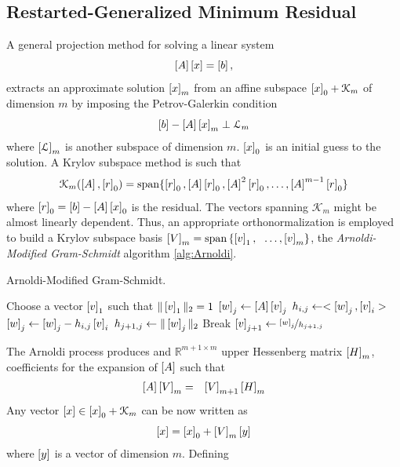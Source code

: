 \subsection{Restarted-Generalized Minimum Residual}

A general projection method for solving a linear system 
$$ \left[A\right] \left[{{x}}\right] = \left[{{b}}\right], $$ 
\noindent extracts an approximate solution $\left[{{x}}\right]_m$ from an affine subspace $\left[{{x}}\right]_0 + \mathcal{K}_m$ of dimension $m$ by imposing the Petrov-Galerkin condition
$$ \left[{{b}}\right] - \left[A\right]\left[{{x}}\right]_m \perp \mathcal{L}_m$$
\noindent where $\left[\mathcal{L}\right]_m$ is another subspace of dimension $m$. $\left[x\right]_0$ is an initial guess to the solution.
A Krylov subspace method is such that
$$\mathcal{K}_m(\left[A\right],\left[{{r}}\right]_0) = \mathrm{span}\{\left[{{r}}\right]_0, \left[A\right]\left[{{r}}\right]_0, \left[A\right]^2\left[{{r}}\right]_0,\ldots,\left[A\right]^{m-1}\left[{{r}}\right]_0\} $$
\noindent where $\left[{{r}}\right]_0 = \left[{{b}}\right]-\left[A\right]\left[{{x}}\right]_0$ is the residual. The vectors spanning $\mathcal{K}_m$ 
might be almost linearly dependent. Thus, an appropriate orthonormalization is employed to build a Krylov subspace basis $\left[V\right]_m = \mathrm{span}\left\{\left[{{v}}\right]_1,\right.$ $\left.\ldots,\left[{{v}}\right]_m 	\right\}$, the \textit{Arnoldi-Modified Gram-Schmidt} algorithm \ref{alg:Arnoldi}.
\begin{algorithm}[ht!]
\begin{algorithmic}
\caption{Arnoldi-Modified Gram-Schmidt.}
\label{alg:Arnoldi}
\State Choose a vector $\left[{{v}}\right]_1$ such that $\Vert \left[{{v}}\right]_1 \Vert_2 = 1$
    \State $\left[{{w}}\right]_j \gets \left[A\right] \left[{{v}}\right]_j$
    	\State $h_{i,j} \gets <\left[{{w}}\right]_j,\left[{{v}}\right]_i>$
		\State $\left[{{w}}\right]_j \gets \left[{{w}}\right]_j - h_{i,j} \left[{{v}}\right]_i$
    \EndFor
    \State $h_{j+1,j} \gets \Vert \left[{{w}}\right]_j \Vert_2$
     \State Break \EndIf
    \State $\left[{{v}}\right]_{j+1} \gets \nicefrac{\left[{{w}}\right]_j}{h_{j+1,j}} $
\EndFor
\end{algorithmic}
\end{algorithm}
%
\noindent The Arnoldi process produces and $\mathbb{R}^{m+1 \times m}$ upper Hessenberg matrix $\left[H\right]_m$, coefficients for the expansion of $\left[A\right]$ such that
\begin{eqnarray}
\label{eq:Hess}
\left[A\right] \left[V\right]_m &= &\left[V\right]_{m+1} \left[H\right]_m
\end{eqnarray}
\noindent Any vector $\left[{{x}}\right] \in \left[{{x}}\right]_0 + \mathcal{K}_m$ can be now written as
$$\left[{{x}}\right] = \left[{{x}}\right]_0 + \left[V\right]_m \left[{{y}}\right]$$
\noindent where $\left[{{y}}\right]$ is a vector of dimension $m$. Defining 
